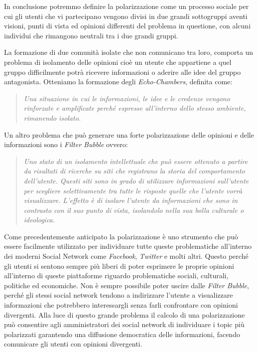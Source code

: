 In conclusione potremmo definire la polarizzazione come un processo sociale per cui gli utenti che vi partecipano vengono divisi in due grandi sottogruppi aventi visioni, punti di vista ed opinioni differenti del problema in questione, con alcuni individui che rimangono neutrali tra i due grandi gruppi.

La formazione di due comunità isolate che non comunicano tra loro, comporta un problema di isolamento delle opinioni
cioè un utente che appartiene a quel gruppo difficilmente potrà ricevere informazioni o aderire alle idee del gruppo antagonista.
Otteniamo  la formazione degli \textit{Echo-Chambers}, definita come:
\begin{quote} 
\textit{Una situazione in cui le informazioni, le idee e le credenze vengono rinforzate e amplificate perché espresse all'interno dello stesso ambiente, rimanendo isolato.}
\end{quote}

Un altro problema che può generare una forte polarizzazione delle opinioni e delle informazioni sono i \textit{Filter Bubble} ovvero:

\begin{quote} 
\textit{Uno stato di un isolamento intellettuale che può essere ottenuto a partire da risultati di ricerche su siti che registrano la storia del comportamento dell'utente. Questi siti sono in grado di utilizzare informazioni sull'utente per scegliere selettivamente tra tutte le risposte quelle che l'utente vorrà visualizzare. L'effetto è di isolare l'utente da informazioni che sono in contrasto con il suo punto di vista, isolandolo nella sua bolla culturale o ideologica.}
\end{quote}

Come precedentemente anticipato la polarizzazione è uno strumento che può essere facilmente utilizzato per individuare tutte queste problematiche all'interno dei moderni Social Network come \textit{Facebook}, \textit{Twitter} e molti altri. Questo perché gli utenti si sentono sempre più liberi di poter esprimere le proprie opinioni all'interno di queste piattaforme riguardo problematiche sociali, culturali, politiche ed economiche.
Non è sempre possibile poter uscire dalle \textit{Filter Bubble}, perché gli stessi social network tendono a indirizzare l'utente a visualizzare informazioni che potrebbero interessargli senza farli confrontare con opinioni divergenti. 
Alla luce di questo grande problema il calcolo di una polarizzazione può consentire agli amministratori dei social network di individuare i topic più polarizzati garantendo una diffusione democratica delle informazioni, facendo comunicare gli utenti con opinioni divergenti.


